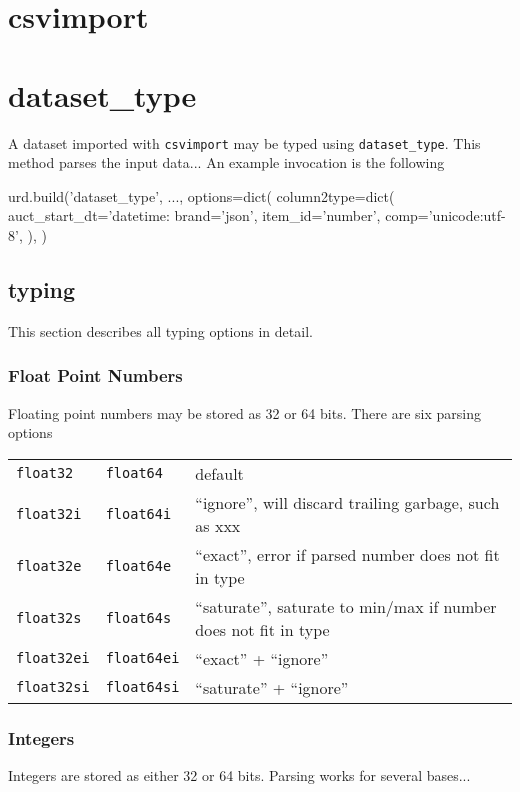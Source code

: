 \section{csvimport}




\clearpage
\section{dataset\_type}

A dataset imported with \texttt{csvimport} may be typed using
\texttt{dataset\_type}.  This method parses the input data...
An example invocation is the following

\begin{python}
urd.build('dataset_type', ...,
  options=dict(
    column2type=dict(
      auct_start_dt='datetime:%
      brand='json',
      item_id='number',
      comp='unicode:utf-8',
    ),
  )
\end{python}


\subsection{typing}
This section describes all typing options in detail.

\subsubsection{Float Point Numbers}
Floating point numbers may be stored as 32 or 64 bits.  There are six parsing options

\begin{tabular}{lll}
\texttt{float32} & \texttt{float64} & default\\
\texttt{float32i} & \texttt{float64i} & ``ignore'', will discard trailing garbage, such as xxx\\
\texttt{float32e} & \texttt{float64e} & ``exact'', error if parsed number does not fit in type \\
\texttt{float32s} & \texttt{float64s} & ``saturate'', saturate to min/max if number does not fit in type \\
\texttt{float32ei} & \texttt{float64ei} & ``exact'' + ``ignore'' \\
\texttt{float32si} & \texttt{float64si} & ``saturate'' + ``ignore'' \\
\end{tabular}

\subsubsection{Integers}
Integers are stored as either 32 or 64 bits.  Parsing works for several bases...

